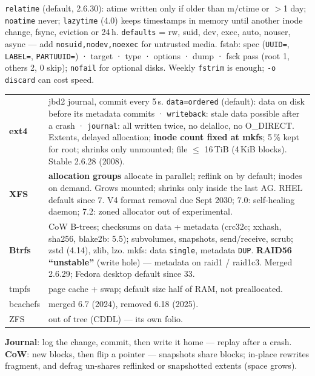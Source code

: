 \documentclass[8pt]{extarticle}
\newcommand\ct[1]{\texttt{#1}}
\newcommand\hd[1]{\par\vspace{2pt}\noindent{\small\bfseries\color{sheetBlue}#1}\par\vspace{1pt}}
\begin{document}
\begin{multicols}{2}
\hd{Mounts and fstab}
\ct{relatime} (default, 2.6.30): atime written only if older than m/ctime or $>$1 day;
\ct{noatime} never; \ct{lazytime} (4.0) keeps timestamps in memory until another inode change,
fsync, eviction or 24\,h. \ct{defaults} = rw, suid, dev, exec, auto, nouser, async — add
\ct{nosuid,nodev,noexec} for untrusted media. fstab: spec (\ct{UUID=}, \ct{LABEL=},
\ct{PARTUUID=}) · target · type · options · dump · fsck pass (root 1, others 2, 0 skip);
\ct{nofail} for optional disks. Weekly \ct{fstrim} is enough; \ct{-o discard} can cost speed.

\columnbreak

\hd{Filesystems}
{\scriptsize\setlength\tabcolsep{2pt}
\begin{tabular}{@{}L{9mm}L{69mm}@{}}
\toprule
\textbf{ext4} & jbd2 journal, commit every 5\,s. \ct{data=ordered} (default): data on disk before
  its metadata commits · \ct{writeback}: stale data possible after a crash · \ct{journal}: all
  written twice, no delalloc, no O\_DIRECT. Extents, delayed allocation; \textbf{inode count fixed
  at mkfs}; 5\,\% kept for root; shrinks only unmounted; file $\le$ 16\,TiB (4\,KiB blocks).
  Stable 2.6.28 (2008).\\
\textbf{XFS} & \textbf{allocation groups} allocate in parallel; reflink on by default; inodes on
  demand. Grows mounted; shrinks only inside the last AG. RHEL default since 7. V4 format removal due
  Sept 2030; 7.0: self-healing daemon; 7.2: zoned allocator out of experimental.\\
\textbf{Btrfs} & CoW B-trees; checksums on data + metadata (crc32c; xxhash, sha256, blake2b: 5.5);
  subvolumes, snapshots, send/receive, scrub; zstd (4.14), zlib, lzo. mkfs: data \ct{single},
  metadata \ct{DUP}. \textbf{RAID56 ``unstable''} (write hole) — metadata on raid1 / raid1c3.
  Merged 2.6.29; Fedora desktop default since 33.\\
tmpfs & page cache + swap; default size half of RAM, not preallocated.\\
bcachefs & merged 6.7 (2024), removed 6.18 (2025).\\
ZFS & out of tree (CDDL) — its own folio.\\
\bottomrule
\end{tabular}}\par
\textbf{Journal}: log the change, commit, then write it home — replay after a crash.
\textbf{CoW}: new blocks, then flip a pointer — snapshots share blocks; in-place rewrites
fragment, and defrag un-shares reflinked or snapshotted extents (space grows).


\end{multicols}
\end{document}
